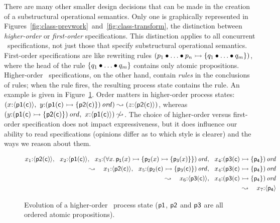 There are many other smaller design decisions that can be made in the
creation of a substructural operational semantics. Only one is
graphically represented in
Figures~\ref{fig:class-prevwork}~and~\ref{fig:class-transform}, the
distinction between {\it higher-order} or {\it first-order}
specifications. This distinction applies to all concurrent
\sls~specifications, not just those that specify substructural
operational semantics. First-order
specifications are like rewriting rules $\left( p_1 \mathbin{\bullet} \ldots \mathbin{\bullet}
  p_n \rightarrowtail \{ q_1 \mathbin{\bullet} \ldots \mathbin{\bullet} q_m \} \right)$, where the head
of the rule $\{ q_1 \mathbin{\bullet} \ldots \mathbin{\bullet} q_m \}$ contains only atomic
propositions. Higher-order \sls~specifications, on the other hand,
contain {\it rules} in the conclusions of rules; when the rule fires,
the resulting process state contains the rule. An example is given 
in Figure~\ref{fig:ho-evo-ex}.
Order matters in higher-order process states: $\left(x{:}\langle {\sf p1(c)} \rangle, ~
y{:}{\left( {\sf p1(c)} \rightarrowtail \{ {\sf p2(c)} \} \right)}\,{{\it ord}}\right)
\leadsto \left(z{:}\langle {\sf p2(c)} \rangle\right)$, whereas 
$\left(y{:}{\left( {\sf p1(c)} \rightarrowtail \{ {\sf p2(c)} \} \right)}\,{{\it ord}},~
x{:}\langle {\sf p1(c)} \rangle\right)
\not \leadsto$. 
%
The choice of higher-order versus first-order specification does not
impact expressiveness, but it does influence our ability to read
specifications (opinions differ as to which style is clearer) and 
the ways we reason about them.

\begin{figure}
\begin{align*}
x_1{:}\langle {{\sf p2}({\sf c})} \rangle, ~~
x_2{:}\langle {{\sf p1}({\sf c})} \rangle, ~~
x_3{:}{(\forall x.\,{\sf p_1}(x) 
                \rightarrowtail \{ {\sf p_2}(x) \rightarrowtail \{ {\sf p_3}(x) \} \})}\,{{\it ord}}, ~~
x_4{:}{({\sf p3}({\sf c}) \rightarrowtail \{ {\sf p_4} \})}\,{{\it ord}} & \\
\leadsto ~~~ 
x_1{:}\langle {{\sf p2}({\sf c})} \rangle, ~~
x_5{:}{({\sf p_2}({\sf c}) \rightarrowtail \{ {\sf p_3}({\sf c}) \})}\,{{\it ord}}, ~~
x_4{:}{({\sf p3}({\sf c}) \rightarrowtail \{ {\sf p_4} \})}\,{{\it ord}} & \\
\leadsto ~~~ 
x_6{:}\langle {{\sf p3}({\sf c})} \rangle, ~~
x_4{:}{({\sf p3}({\sf c}) \rightarrowtail \{ {\sf p_4} \})}\,{{\it ord}} & \\
\leadsto ~~~ 
x_7{:}\langle {{\sf p_4}} \rangle & 
\end{align*}
\caption{Evolution of a higher-order \sls~process state (${\sf p1}$, ${\sf
  p2}$ and ${\sf p3}$ are all ordered atomic propositions).}
\label{fig:ho-evo-ex}
\end{figure}

